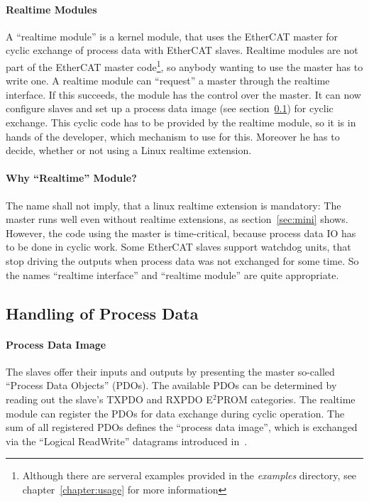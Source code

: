 \documentclass[a4paper,12pt,BCOR6mm,bibtotoc,idxtotoc]{scrbook}
\begin{document}
\paragraph{Realtime Modules}

A ``realtime module'' is a kernel module, that
uses the EtherCAT master for cyclic exchange of process data with
EtherCAT slaves. Realtime modules are not part of the EtherCAT master
code\footnote{Although there are serveral examples provided in the
  \textit{examples} directory, see chapter~\ref{chapter:usage} for
  more information}, so anybody wanting to use the master has to write
one. A realtime module can ``request'' a master through the realtime
interface. If this succeeds, the module has the control over the
master. It can now configure slaves and set up a process data image
(see section~\ref{sec:processdata}) for cyclic exchange. This cyclic
code has to be provided by the realtime module, so it is in hands of
the developer, which mechanism to use for this. Moreover he has to
decide, whether or not using a Linux realtime extension.

\paragraph{Why ``Realtime'' Module?}

The name shall not imply, that a linux realtime extension is
mandatory: The master runs well even without realtime extensions, as
section~\ref{sec:mini} shows. However, the code using the master is
time-critical, because process data IO has to be done in cyclic work.
Some EtherCAT slaves support watchdog units, that stop driving the
outputs when process data was not exchanged for some time. So the
names ``realtime interface'' and ``realtime module'' are quite
appropriate.


\subsection{Handling of Process Data}
\label{sec:processdata}

\paragraph{Process Data Image}

The slaves offer their inputs and outputs by presenting the master
so-called ``Process Data Objects'' (PDOs). The available
PDOs can be determined by reading out the slave's TXPDO and RXPDO
E$^2$PROM categories. The realtime module can register the PDOs for
data exchange during cyclic operation. The sum of all registered PDOs
defines the ``process data image'', which is exchanged via the
``Logical ReadWrite'' datagrams introduced
in~\cite[section~5.4.2.4]{dlspec}.
\end{document}
